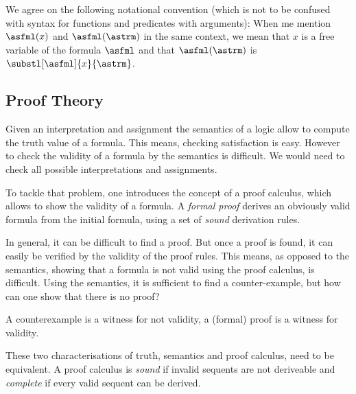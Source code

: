             We agree on the following notational convention
            (which is not to be confused with syntax for functions and predicates with arguments):
            When me mention $\asfml(x)$ and $\asfml(\astrm)$ in the same context, we mean that $x$ is a free variable of the formula $\asfml$ and that $\asfml(\astrm)$ is $\substl[\asfml]{x}{\astrm}$.

        \subsection{Proof Theory}
            \label{sec:FOL-proof-theory}

            
            Given an interpretation and assignment the semantics of a logic allow to compute the truth value of a formula. This means, checking satisfaction is easy.
            However to check the validity of a formula by the semantics is difficult. We would need to check all possible interpretations and assignments.

            To tackle that problem, one introduces the concept of a proof calculus, which allows to show the validity of a formula.
            A \emph{formal proof} derives an obviously valid formula from the initial formula, using a set of \emph{sound} derivation rules.

            In general, it can be difficult to find a proof.
            But once a proof is found, it can easily be verified by the validity of the proof rules.
            This means, as opposed to the semantics, showing that a formula is not valid using the proof calculus, is difficult.
            Using the semantics, it is sufficient to find a counter-example, but how can one show that there is no proof?


            A counterexample is a witness for not validity, a (formal) proof is a witness for validity. 


            These two characterisations of truth, semantics and proof calculus, need to be equivalent.
            A proof calculus is \emph{sound} if invalid sequents are not deriveable and \emph{complete} if every valid sequent can be derived.

